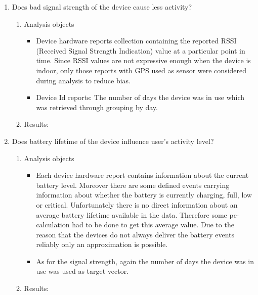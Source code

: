 \begin{enumerate}
	\item Does bad signal strength of the device cause less activity?
	\begin{enumerate}
		\item Analysis objects
		\begin{itemize}
			\item Device hardware reports collection containing the reported RSSI (Received Signal Strength Indication) value at a particular point in time. Since RSSI values are not expressive enough when the device is indoor, only those reports with GPS used as sensor were considered during analysis to reduce bias.
			\item Device Id reports: The number of days the device was in use which was retrieved through grouping by day. 
		\end{itemize}
		\item Results:
	\end{enumerate}

	\item Does battery lifetime of the device influence user's activity level?
	\begin{enumerate}
		\item Analysis objects
		\begin{itemize}
			\item Each device hardware report contains information about the current battery level. Moreover there are some defined events carrying information about whether the battery is currently charging, full, low or critical. Unfortunately there is no direct information about an average battery lifetime available in the data. Therefore some pe-calculation had to be done to get this average value. Due to the reason that the devices do not always deliver the battery events reliably only an approximation is possible. 
			\item As for the signal strength, again the number of days the device was in use was used as target vector.
		\end{itemize}
		\item Results:
	\end{enumerate}
	
\end{enumerate}


